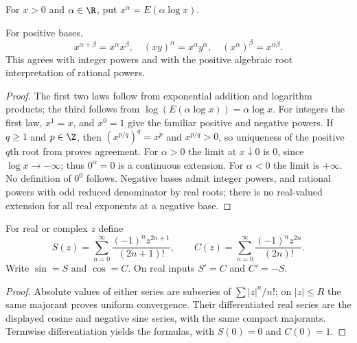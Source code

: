 \begin{definition}
For $x>0$ and $\alpha\in\R$, put $x^\alpha=E(\alpha\log x)$.
\end{definition}
\begin{proposition}
For positive bases,
\[x^{\alpha+\beta}=x^\alpha x^\beta,\quad
(xy)^\alpha=x^\alpha y^\alpha,\quad (x^\alpha)^\beta=x^{\alpha\beta}.
\]
This agrees with integer powers and with the positive algebraic root
interpretation of rational powers.
\end{proposition}
\begin{proof}
The first two laws follow from exponential addition and logarithm products;
the third follows from $\log(E(\alpha\log x))=\alpha\log x$.
For integers the first law, $x^1=x$, and $x^0=1$ give the familiar positive
and negative powers. If $q\ge1$ and $p\in\Z$, then
$(x^{p/q})^q=x^p$ and $x^{p/q}>0$, so uniqueness of the positive $q$th
root from  proves agreement.
For $\alpha>0$ the limit at $x\downarrow0$ is $0$, since $\log x\to-\infty$;
thus $0^\alpha=0$ is a continuous extension. For $\alpha<0$ the limit is
$+\infty$. No definition of $0^0$ follows. Negative bases admit integer
powers, and rational powers with odd reduced denominator by real roots;
there is no real-valued extension for all real exponents at a negative base.
\end{proof}

\begin{construction}
For real or complex $z$ define
\[S(z)=\sum_{n=0}^{\infty}\frac{(-1)^nz^{2n+1}}{(2n+1)!},\qquad
C(z)=\sum_{n=0}^{\infty}\frac{(-1)^nz^{2n}}{(2n)!}.
\]
Write $\sin=S$ and $\cos=C$. On real inputs $S'=C$ and $C'=-S$.
\end{construction}
\begin{proof}
Absolute values of either series are subseries of $\sum |z|^n/n!$;
on $|z|\le R$ the same majorant proves uniform convergence. Their
differentiated real series are the displayed cosine and negative sine
series, with the same compact majorants. Termwise differentiation yields
the formulas, with $S(0)=0$ and $C(0)=1$.
\end{proof}

